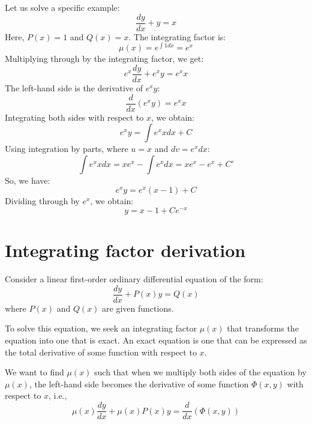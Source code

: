 \documentclass[a4paper,12pt]{article}
\begin{document}
Let us solve a specific example:
\begin{equation}
    \frac{dy}{dx} + y = x
\end{equation}
Here, \( P(x) = 1 \) and \( Q(x) = x \). The integrating factor is:
\begin{equation}
    \mu(x) = e^{\int 1 dx} = e^x
\end{equation}
Multiplying through by the integrating factor, we get:
\begin{equation}
    e^x \frac{dy}{dx} + e^x y = e^x x
\end{equation}
The left-hand side is the derivative of \( e^x y \):
\begin{equation}
    \frac{d}{dx} (e^x y) = e^x x
\end{equation}
Integrating both sides with respect to \( x \), we obtain:
\begin{equation}
    e^x y = \int e^x x dx + C
\end{equation}
Using integration by parts, where \( u = x \) and \( dv = e^x dx \):
\begin{equation}
    \int e^x x dx = x e^x - \int e^x dx = x e^x - e^x + C'
\end{equation}
So, we have:
\begin{equation}
    e^x y = e^x (x - 1) + C
\end{equation}
Dividing through by \( e^x \), we obtain:
\begin{equation}
    y = x - 1 + Ce^{-x}
\end{equation}
\section{Integrating factor derivation}

Consider a linear first-order ordinary differential equation of the form:
\begin{equation}
    \frac{dy}{dx} + P(x)y = Q(x)
\end{equation}
where \( P(x) \) and \( Q(x) \) are given functions.

To solve this equation, we seek an integrating factor \( \mu(x) \) that transforms the equation into one that is exact. An exact equation is one that can be expressed as the total derivative of some function with respect to \( x \).

We want to find \( \mu(x) \) such that when we multiply both sides of the equation by \( \mu(x) \), the left-hand side becomes the derivative of some function \( \Phi(x, y) \) with respect to \( x \), i.e.,
\begin{equation}
    \mu(x) \frac{dy}{dx} + \mu(x) P(x) y = \frac{d}{dx} \left( \Phi(x, y) \right)
\end{equation}
\end{document}
